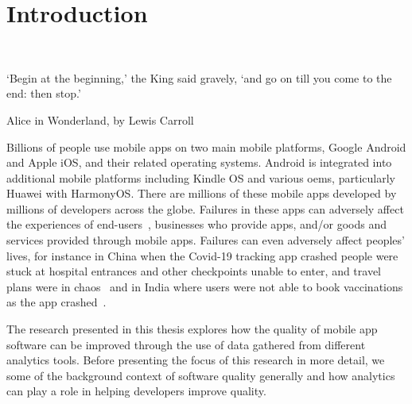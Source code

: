 \setchapterpreamble[u]{\margintoc} %
\chapter{Introduction}~\label{chapter-introduction}

\epigraph{`Begin at the beginning,' the King said gravely, `and go on till you come to the end: then stop.'}{Alice in Wonderland, by Lewis Carroll}

\bigskip

\bigskip


Billions of people use mobile apps on two main mobile platforms, Google Android and Apple iOS, and their related operating systems.  Android is integrated into additional mobile platforms including Kindle OS and various \glspl{oem}, particularly Huawei with HarmonyOS. There are millions of these mobile apps developed by millions of developers across the globe. Failures in these apps can adversely affect the experiences of end-users~, businesses who provide apps, and/or goods and services provided through mobile apps. Failures can even adversely affect peoples' lives, for instance in China when the Covid-19 tracking app crashed people were stuck at hospital entrances and other checkpoints unable to enter, and travel plans were in chaos~ and in India where users were not able to book vaccinations as the app crashed~.

The research presented in this thesis explores how the quality of mobile app software can be improved through the use of data gathered from different analytics tools. Before presenting the focus of this research in more detail, we some of the background context of software quality generally and how analytics can play a role in helping developers improve quality.

